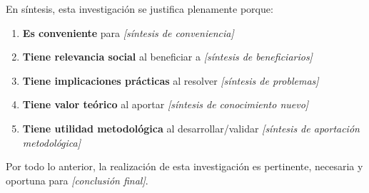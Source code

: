 En síntesis, esta investigación se justifica plenamente porque:

\begin{enumerate}
    \item \textbf{Es conveniente} para \textit{[síntesis de conveniencia]}
    \item \textbf{Tiene relevancia social} al beneficiar a \textit{[síntesis de beneficiarios]}
    \item \textbf{Tiene implicaciones prácticas} al resolver \textit{[síntesis de problemas]}
    \item \textbf{Tiene valor teórico} al aportar \textit{[síntesis de conocimiento nuevo]}
    \item \textbf{Tiene utilidad metodológica} al desarrollar/validar \textit{[síntesis de aportación metodológica]}
\end{enumerate}

Por todo lo anterior, la realización de esta investigación es pertinente, necesaria y oportuna para \textit{[conclusión final]}.

%
%
